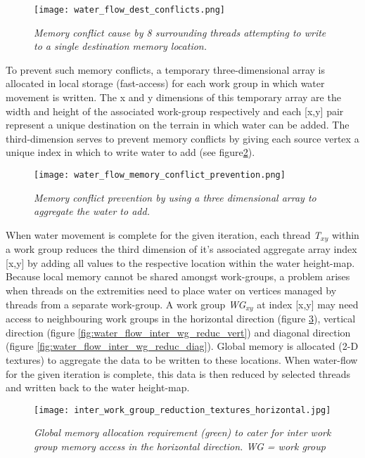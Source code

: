 \begin{figure}
\center
	\texttt{[image: water\_flow\_dest\_conflicts.png]}
	\caption{ \textit{Memory conflict cause by 8 surrounding threads attempting to write to a single destination memory location.} }
	\label{fig:water_flow_dest_conflicts}
\end{figure}

To prevent such memory conflicts, a temporary three-dimensional array is allocated in local storage (fast-access) for each work group in which water movement is written. The x and y dimensions of this temporary array are the width and height of the associated work-group respectively and each [x,y] pair represent a unique destination on the terrain in which water can be added. The third-dimension serves to prevent memory conflicts by giving each source vertex a unique index in which to write water to add (see figure\ref{fig:water_flow_dest_conflict_prevent}).\\

\begin{figure}
\center
	\texttt{[image: water\_flow\_memory\_conflict\_prevention.png]}
	\caption{ \textit{Memory conflict prevention by using a three dimensional array to aggregate the water to add.} }
	\label{fig:water_flow_dest_conflict_prevent}
\end{figure}

When water movement is complete for the given iteration, each thread \textit{T$_{xy}$} within a work group reduces the third dimension of it's associated aggregate array index [x,y] by adding all values to the respective location within the water height-map.\\

Because local memory cannot be shared amongst work-groups, a problem arises when threads on the extremities need to place water on vertices managed by threads from a separate work-group. A work group \textit{WG$_{xy}$} at index [x,y] may need access to neighbouring work groups in the horizontal direction (figure \ref{fig:water_flow_inter_wg_reduc_horiz}), vertical direction (figure \ref{fig:water_flow_inter_wg_reduc_vert}) and diagonal direction (figure \ref{fig:water_flow_inter_wg_reduc_diag}). Global memory is allocated (2-D textures) to aggregate the data to be written to these locations. When water-flow for the given iteration is complete, this data is then reduced by selected threads and written back to the water height-map.

\begin{figure}
\center
	\texttt{[image: inter\_work\_group\_reduction\_textures\_horizontal.jpg]}
	\caption{ \textit{Global memory allocation requirement (green) to cater for inter work group memory access in the horizontal direction. \textit{WG} = work group}}
	\label{fig:water_flow_inter_wg_reduc_horiz}
\end{figure}

